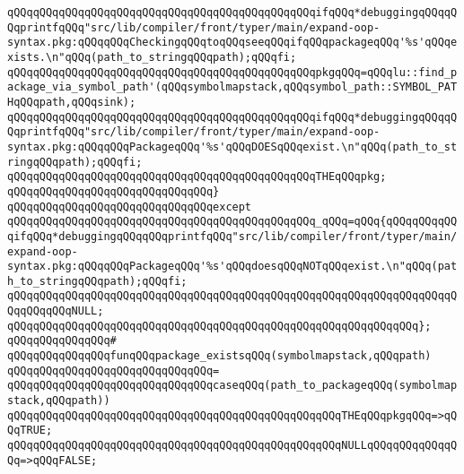 \newline
\verb|qQQqqQQqqQQqqQQqqQQqqQQqqQQqqQQqqQQqqQQqqQQqqQQqifqQQq*debuggingqQQqqQQqprintfqQQq"src/lib/compiler/front/typer/main/expand-oop-syntax.pkg:qQQqqQQqCheckingqQQqtoqQQqseeqQQqifqQQqpackageqQQq'%s'qQQqexists.\n"qQQq(path_to_stringqQQqpath);qQQqfi;|\newline
\newline
\verb|qQQqqQQqqQQqqQQqqQQqqQQqqQQqqQQqqQQqqQQqqQQqqQQqpkgqQQq=qQQqlu::find_package_via_symbol_path'(qQQqsymbolmapstack,qQQqsymbol_path::SYMBOL_PATHqQQqpath,qQQqsink);|\newline
\newline
\verb|qQQqqQQqqQQqqQQqqQQqqQQqqQQqqQQqqQQqqQQqqQQqqQQqifqQQq*debuggingqQQqqQQqprintfqQQq"src/lib/compiler/front/typer/main/expand-oop-syntax.pkg:qQQqqQQqPackageqQQq'%s'qQQqDOESqQQqexist.\n"qQQq(path_to_stringqQQqpath);qQQqfi;|\newline
\newline
\verb|qQQqqQQqqQQqqQQqqQQqqQQqqQQqqQQqqQQqqQQqqQQqqQQqTHEqQQqpkg;|\newline
\verb|qQQqqQQqqQQqqQQqqQQqqQQqqQQqqQQq}|\newline
\verb|qQQqqQQqqQQqqQQqqQQqqQQqqQQqqQQqexcept|\newline
\verb|qQQqqQQqqQQqqQQqqQQqqQQqqQQqqQQqqQQqqQQqqQQqqQQq_qQQq=qQQq{qQQqqQQqqQQqifqQQq*debuggingqQQqqQQqprintfqQQq"src/lib/compiler/front/typer/main/expand-oop-syntax.pkg:qQQqqQQqPackageqQQq'%s'qQQqdoesqQQqNOTqQQqexist.\n"qQQq(path_to_stringqQQqpath);qQQqfi;|\newline
\verb|qQQqqQQqqQQqqQQqqQQqqQQqqQQqqQQqqQQqqQQqqQQqqQQqqQQqqQQqqQQqqQQqqQQqqQQqqQQqqQQqNULL;|\newline
\verb|qQQqqQQqqQQqqQQqqQQqqQQqqQQqqQQqqQQqqQQqqQQqqQQqqQQqqQQqqQQqqQQq};|\newline
\newline
\verb|qQQqqQQqqQQqqQQq#|\newline
\verb|qQQqqQQqqQQqqQQqfunqQQqpackage_existsqQQq(symbolmapstack,qQQqpath)|\newline
\verb|qQQqqQQqqQQqqQQqqQQqqQQqqQQqqQQq=|\newline
\verb|qQQqqQQqqQQqqQQqqQQqqQQqqQQqqQQqcaseqQQq(path_to_packageqQQq(symbolmapstack,qQQqpath))|\newline
\verb|qQQqqQQqqQQqqQQqqQQqqQQqqQQqqQQqqQQqqQQqqQQqqQQqqQQqTHEqQQqpkgqQQq=>qQQqTRUE;|\newline
\verb|qQQqqQQqqQQqqQQqqQQqqQQqqQQqqQQqqQQqqQQqqQQqqQQqqQQqNULLqQQqqQQqqQQqqQQq=>qQQqFALSE;|\newline
